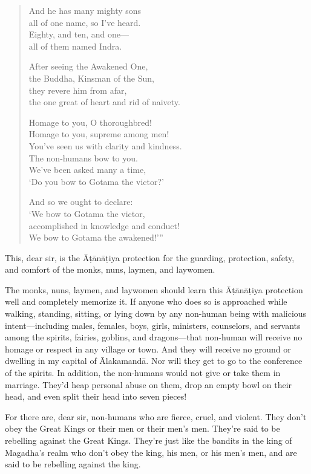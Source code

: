 \documentclass[12pt,openany]{book}%
\begin{document}
\begin{verse}
And he has many mighty sons \\
all of one name, so I’ve heard. \\
Eighty, and ten, and one—\\
all of them named Indra. 

After seeing the Awakened One, \\
the Buddha, Kinsman of the Sun, \\
they revere him from afar, \\
the one great of heart and rid of naivety. 

Homage to you, O thoroughbred! \\
Homage to you, supreme among men! \\
You’ve seen us with clarity and kindness. \\
The non-humans bow to you. \\
We’ve been asked many a time, \\
‘Do you bow to Gotama the victor?’ 

And so we ought to declare: \\
‘We bow to Gotama the victor, \\
accomplished in knowledge and conduct! \\
We bow to Gotama the awakened!’” 

%
\end{verse}

This, dear sir, is the \textsanskrit{Āṭānāṭiya} protection for the guarding, protection, safety, and comfort of the monks, nuns, laymen, and laywomen. 

The monks, nuns, laymen, and laywomen should learn this \textsanskrit{Āṭānāṭiya} protection well and completely memorize it. If anyone who does so is approached while walking, standing, sitting, or lying down by any non-human being with malicious intent—including males, females, boys, girls, ministers, counselors, and servants among the spirits, fairies, goblins, and dragons—that non-human will receive no homage or respect in any village or town. And they will receive no ground or dwelling in my capital of \textsanskrit{Ālakamandā}. Nor will they get to go to the conference of the spirits. In addition, the non-humans would not give or take them in marriage. They’d heap personal abuse on them, drop an empty bowl on their head, and even split their head into seven pieces! 

For there are, dear sir, non-humans who are fierce, cruel, and violent. They don’t obey the Great Kings or their men or their men’s men. They’re said to be rebelling against the Great Kings. They’re just like the bandits in the king of Magadha’s realm who don’t obey the king, his men, or his men’s men, and are said to be rebelling against the king. 
\end{document}
